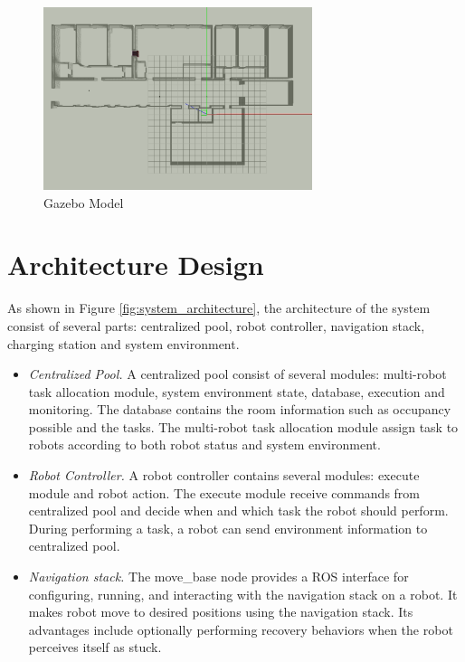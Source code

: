 \begin{figure}[htbp]
	\centering
	\includegraphics[width = 0.7\textwidth]{content/images/ch3/gazebo_model.png}
	\caption{Gazebo Model}
	\label{fig:gazebo_model}
\end{figure}

\section{Architecture Design}

As shown in Figure \ref{fig:system_architecture}, the architecture of the system consist of several parts: centralized pool, robot controller, navigation stack, charging station and system environment. 
\begin{itemize}
	\item \textsl{Centralized Pool.} A centralized pool consist of several modules: multi-robot task allocation module, system environment state, database, execution and monitoring. The database contains the room information such as occupancy possible and the tasks. The multi-robot task allocation module assign task to robots according to both robot status and system environment.
	\item \textsl{Robot Controller.} A robot controller contains several modules: execute module and robot action. The execute module receive commands from centralized pool and decide when and which task the robot should perform. During performing a task, a robot can send environment information to centralized pool.
	\item \textsl{Navigation stack.} The move\_base node provides a ROS interface for configuring, running, and interacting with the navigation stack on a robot. It makes robot move to desired positions using the navigation stack. Its advantages include optionally performing recovery behaviors when the robot perceives itself as stuck. 
\end{itemize} 

